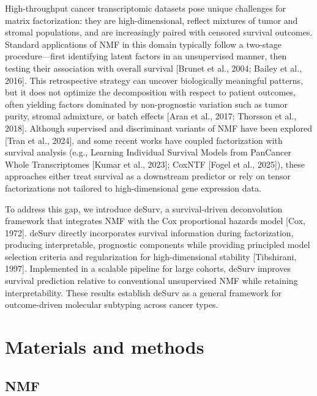 \documentclass[9pt,twocolumn,twoside,]{pnas-new}
\begin{document}
High-throughput cancer transcriptomic datasets pose unique challenges
for matrix factorization: they are high-dimensional, reflect mixtures of
tumor and stromal populations, and are increasingly paired with censored
survival outcomes. Standard applications of NMF in this domain typically
follow a two-stage procedure---first identifying latent factors in an
unsupervised manner, then testing their association with overall
survival {[}Brunet et al., 2004; Bailey et al., 2016{]}. This
retrospective strategy can uncover biologically meaningful patterns, but
it does not optimize the decomposition with respect to patient outcomes,
often yielding factors dominated by non-prognostic variation such as
tumor purity, stromal admixture, or batch effects {[}Aran et al., 2017;
Thorsson et al., 2018{]}. Although supervised and discriminant variants
of NMF have been explored {[}Tran et al., 2024{]}, and some recent works
have coupled factorization with survival analysis (e.g., Learning
Individual Survival Models from PanCancer Whole Transcriptomes {[}Kumar
et al., 2023{]}; CoxNTF {[}Fogel et al., 2025{]}), these approaches
either treat survival as a downstream predictor or rely on tensor
factorizations not tailored to high-dimensional gene expression data.

To address this gap, we introduce deSurv, a survival-driven
deconvolution framework that integrates NMF with the Cox proportional
hazards model {[}Cox, 1972{]}. deSurv directly incorporates survival
information during factorization, producing interpretable, prognostic
components while providing principled model selection criteria and
regularization for high-dimensional stability {[}Tibshirani, 1997{]}.
Implemented in a scalable pipeline for large cohorts, deSurv improves
survival prediction relative to conventional unsupervised NMF while
retaining interpretability. These results establish deSurv as a general
framework for outcome-driven molecular subtyping across cancer types.

\section*{Materials and methods}\label{materials-and-methods}

\subsection*{NMF}\label{nmf}
\end{document}
